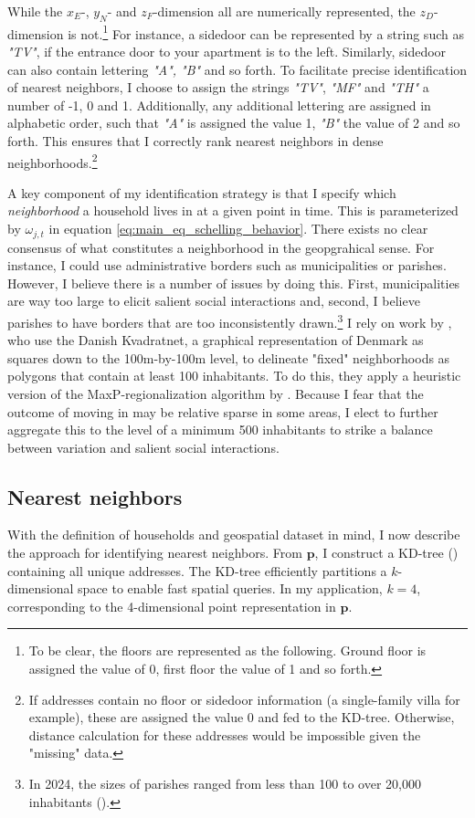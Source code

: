 \documentclass[main.tex]{subfiles}
\begin{document}
While the $x_E$-, $y_N$- and $z_F$-dimension all are numerically represented, the $z_D$-dimension is not.\footnote{To be clear, the floors are represented as the following. Ground floor is assigned the value of 0, first floor the value of 1 and so forth.} For instance, a sidedoor can be represented by a string such as \textit{"TV"}, if the entrance door to your apartment is to the left. Similarly, sidedoor can also contain lettering \textit{"A", "B"} and so forth. To facilitate precise identification of nearest neighbors, I choose to assign the strings \textit{"TV"}, \textit{"MF"} and \textit{"TH"} a number of -1, 0 and 1. Additionally, any additional lettering are assigned in alphabetic order, such that \textit{"A"} is assigned the value 1, \textit{"B"} the value of 2 and so forth. This ensures that I correctly rank nearest neighbors in dense neighborhoods.\footnote{If addresses contain no floor or sidedoor information (a single-family villa for example), these are assigned the value 0 and fed to the KD-tree. Otherwise, distance calculation for these addresses would be impossible given the "missing" data.}

A key component of my identification strategy is that I specify which \textit{neighborhood} a household lives in at a given point in time. This is parameterized by $\omega_{j,t}$ in equation \ref{eq:main_eq_schelling_behavior}. There exists no clear consensus of what constitutes a neighborhood in the geopgrahical sense. For instance, I could use administrative borders such as municipalities or parishes. However, I believe there is a number of issues by doing this. First, municipalities are way too large to elicit salient social interactions and, second, I believe parishes to have borders that are too inconsistently drawn.\footnote{In 2024, the sizes of parishes ranged from less than 100 to over 20,000 inhabitants (\textcite{dst_sogn_stats}).} I rely on work by \textcite{nabolagsatlas_neighborhoods_boje2023}, who use the Danish Kvadratnet, a graphical representation of Denmark as squares down to the 100m-by-100m level, to delineate "fixed" neighborhoods as polygons that contain at least 100 inhabitants. To do this, they apply a heuristic version of the MaxP-regionalization algorithm by \textcite{maxp_heuristic_wei2021efficient}. Because I fear that the outcome of moving in may be relative sparse in some areas, I elect to further aggregate this to the level of a minimum 500 inhabitants to strike a balance between variation and salient social interactions. 

\subsection{Nearest neighbors}
With the definition of households and geospatial dataset in mind, I now describe the approach for identifying nearest neighbors. From $\mathbf{p}$, I construct a KD-tree (\textcite{bentley1975multidimensional}) containing all unique addresses. The KD-tree efficiently partitions a $k$-dimensional space to enable fast spatial queries. In my application, $k=4$, corresponding to the 4-dimensional point representation in $\mathbf{p}$.
\end{document}
